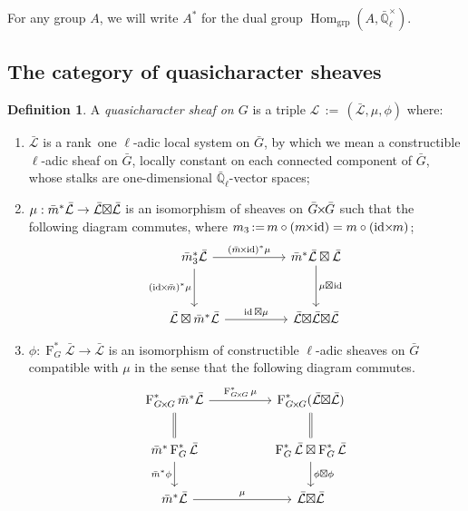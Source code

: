 \documentclass{amsart}
\makeatletter
\theoremstyle{plain}
\theoremstyle{definition}
\newtheorem{definition}[theorem]{Definition}
\theoremstyle{remark}
\newcommand{\EE}{\mathbb{\bar Q}_\ell}
\newcommand{\EEx}{\EE^\times}
\newcommand{\Frob}[1]{\operatorname{F}_{#1}}
\DeclareMathOperator{\Hom}{Hom}
\DeclareMathOperator{\id}{id}
\newcommand{\ceq}{{\, :=\, }}
\newcommand{\qcs}[1]{{\mathcal{#1}}}
\newcommand{\gqcs}[1]{{\mathcal{\bar #1}}}
\newcommand{\labitem}[2]{
\def\@itemlabel{\textbf{#1}}
\item
\def\@currentlabel{#1}\label{#2}}
\newcommand{\bm}{\bar{m}}
\newcommand{\bG}{\bar{G}}
\newcommand{\tight}[3]{\hspace{-#1pt}{#2}\hspace{-#3pt}}
\newcommand{\bGxG}{\text{$\bar{G} \tight{1}{\times}{1} \bar{G}$}}
\newcommand{\GxxG}{\text{$G \tight{1}{\times}{1} G$}}
\newcommand{\LxL}{\text{$\gqcs{L} \tight{0}{\boxtimes}{0} \gqcs{L}$}}
\makeatother
\begin{document}
For any group $A$, we will write $A^*$ for the dual group $\Hom_\text{grp}(A, \EEx)$.

\subsection{The category of quasicharacter sheaves}\label{sec:category}

\begin{definition}\label{def:QC}
A \emph{quasicharacter sheaf on $G$} is a triple
$\qcs{L}\ceq (\gqcs{L},\mu,\phi)$ where:
\begin{enumerate}
\labitem{(QC.1)}{QC.1} $\gqcs{L}$ is a rank~one $\ell$-adic local system on $\bG$, by which we mean
a constructible $\ell$-adic sheaf on $\bG$, locally constant on each connected
component of $\bG$, whose stalks are one-dimensional $\EE$-vector spaces;
\labitem{(QC.2)}{QC.2} $\mu: \bm^* \gqcs{L} \to \LxL$ is an isomorphism of
sheaves on $\bGxG$ such that the following diagram commutes,
  where $m_3 \ceq m\circ (m\tight{1}{\times}{2}\id) = m\circ (\id\tight{2}{\times}{1} m)$;
  \[
  \begin{tikzcd}[row sep=30]
  \bm_3^*\gqcs{L} \arrow{rr}{(\bm \tight{1}{\times}{2} \id)^*\mu} \arrow[swap]{d}{(\id \tight{2}{\times}{1} \bm)^*\mu}
    &&  \bm^*\gqcs{L} \boxtimes \gqcs{L} \dar{\mu \tight{0}{\boxtimes}{1} \id} \\
    \gqcs{L} \boxtimes \bm^* \gqcs{L} \arrow{rr}{\id \boxtimes \mu}
    &&  \gqcs{L} \tight{0}{\boxtimes}{0} \LxL
  \end{tikzcd}
  \]
\labitem{(QC.3)}{QC.3} $\phi : \Frob{G}^* \gqcs{L} \to \gqcs{L}$ is an
  isomorphism of constructible $\ell$-adic sheaves on $\bG$ compatible with
  $\mu$ in the sense that the following diagram commutes.
  \[
  \begin{tikzcd}[row sep=20]
  \Frob{\GxxG}^* \bm^* \gqcs{L} \arrow{rr}{\Frob{\GxxG}^*\mu}
    && \Frob{\GxxG}^*(\LxL)\\
    \arrow[equal]{u} \bm^*  \Frob{G}^* \gqcs{L} \arrow[swap]{d}{\bm^* \phi}
    && \Frob{G}^*\gqcs{L}\boxtimes \Frob{G}^*\gqcs{L} \dar{\phi\boxtimes \phi} \arrow[equal]{u} \\
    \bm^*\gqcs{L} \arrow{rr}{\mu}
    && \LxL
  \end{tikzcd}
  \]
\end{enumerate}
\end{definition}
\end{document}
